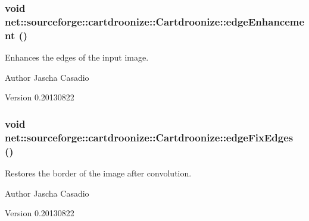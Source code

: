 \hypertarget{classnet_1_1sourceforge_1_1cartdroonize_1_1Cartdroonize_aa96080dadc14446e14fa2ad87e3c6517}{
\subsubsection[{edgeEnhancement}]{\setlength{\rightskip}{0pt plus 5cm}void net::sourceforge::cartdroonize::Cartdroonize::edgeEnhancement ()}}
\label{classnet_1_1sourceforge_1_1cartdroonize_1_1Cartdroonize_aa96080dadc14446e14fa2ad87e3c6517}


Enhances the edges of the input image. \begin{DoxyAuthor}{Author}
Jascha Casadio 
\end{DoxyAuthor}
\begin{DoxyVersion}{Version}
0.20130822
\end{DoxyVersion}


\hypertarget{classnet_1_1sourceforge_1_1cartdroonize_1_1Cartdroonize_ad69a655473d02551eebb461899470d5d}{
\subsubsection[{edgeFixEdges}]{\setlength{\rightskip}{0pt plus 5cm}void net::sourceforge::cartdroonize::Cartdroonize::edgeFixEdges ()}}
\label{classnet_1_1sourceforge_1_1cartdroonize_1_1Cartdroonize_ad69a655473d02551eebb461899470d5d}


Restores the border of the image after convolution. \begin{DoxyAuthor}{Author}
Jascha Casadio 
\end{DoxyAuthor}
\begin{DoxyVersion}{Version}
0.20130822
\end{DoxyVersion}


